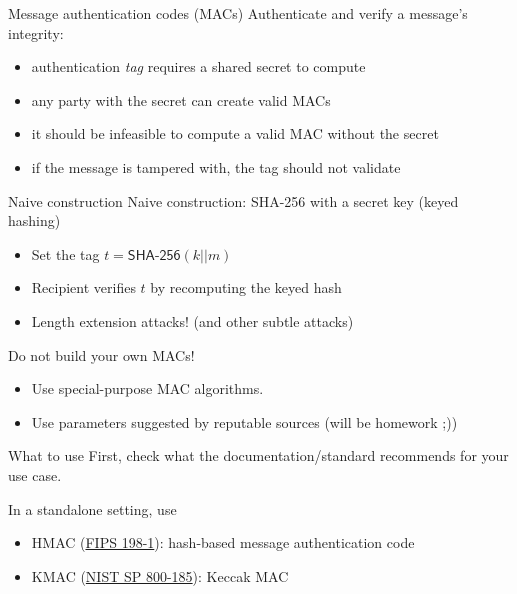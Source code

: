 \begin{frame}{Message authentication codes (MACs)}
  Authenticate and verify a message's integrity:
  \begin{itemize}[<+(1)->]
    \item authentication \emph{tag} requires a shared secret to compute
    \item any party with the secret can create valid MACs
    \item it should be infeasible to compute a valid MAC without the secret
    \item if the message is tampered with, the tag should not validate
  \end{itemize}
\end{frame}

\begin{frame}{Naive construction}
  Naive construction: SHA-256 with a secret key (keyed hashing)
  \begin{itemize}[<+(1)->]
    \item Set the tag $t = \mathsf{SHA\text{-}256}(k||m)$
    \item Recipient verifies $t$ by recomputing the keyed hash
    \item Length extension attacks! (and other subtle attacks)
  \end{itemize}

  \vspace*{1em}

  \pause
  Do not build your own MACs!
  \begin{itemize}[<+(1)->]
    \item Use special-purpose MAC algorithms.
    \item Use parameters suggested by reputable sources (will be homework ;))
  \end{itemize}
\end{frame}

\begin{frame}{What to use}
  First, check what the documentation/standard recommends for your use case.

  \vspace*{1em}

  \pause
  In a standalone setting, use
  \begin{itemize}[<+(1)->]
    \item HMAC (\href{https://csrc.nist.gov/pubs/fips/198-1/final}{FIPS 198-1}): hash-based message authentication code
    \item KMAC (\href{https://csrc.nist.gov/pubs/sp/800/185/final}{NIST SP 800-185}): Keccak MAC
  \end{itemize}
\end{frame}

